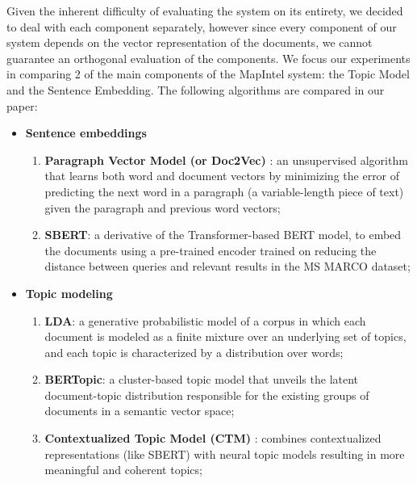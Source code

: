 \documentclass[a4paper]{article}
\begin{document}
Given the inherent difficulty of evaluating the system on its entirety, we decided to deal with each component separately, however since every component of our system depends on the vector representation of the documents, we cannot guarantee an orthogonal evaluation of the components. We focus our experiments in comparing 2 of the main components of the MapIntel system: the Topic Model and the Sentence Embedding. The following algorithms are compared in our paper:
\begin{itemize}
  \item \textbf{Sentence embeddings}
    \begin{enumerate}
      \item \textbf{Paragraph Vector Model (or Doc2Vec)} \citep{le2014}: an unsupervised algorithm that learns both word and document vectors by minimizing the error of predicting the next word in a paragraph (a variable-length piece of text) given the paragraph and previous word vectors;
      \item \textbf{SBERT}: a derivative of the Transformer-based BERT model, to embed the documents using a pre-trained encoder trained on reducing the distance between queries and relevant results in the MS MARCO dataset; 
    \end{enumerate}
  \item \textbf{Topic modeling}
    \begin{enumerate}
      \item \textbf{LDA}: a generative probabilistic model of a corpus in which each document is modeled as a finite mixture over an underlying set of topics, and each topic is characterized by a distribution over words;
      \item \textbf{BERTopic}: a cluster-based topic model that unveils the latent document-topic distribution responsible for the existing groups of documents in a semantic vector space;
      \item \textbf{Contextualized Topic Model (CTM)} \citep{bianchi2021}: combines contextualized representations (like SBERT) with neural topic models resulting in more meaningful and coherent topics;
    \end{enumerate}
\end{itemize}
\end{document}
